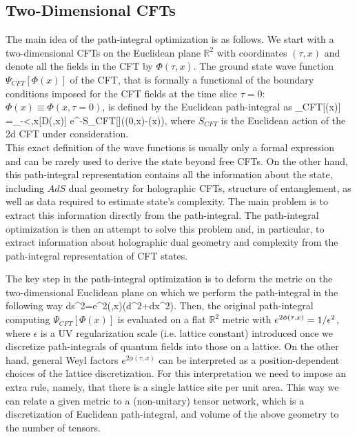 \documentclass[a4paper,12pt]{article}
\begin{document}
\subsection{Two-Dimensional CFTs}
The main idea of the path-integral optimization is as follows. We start with a two-dimensional CFTs on the Euclidean plane $\mathbb{R}^2$ with coordinates $(\tau,x)$ and denote all the fields in the CFT by $\Phi(\tau,x)$. The ground state wave function $\Psi_{CFT}[\Phi(x)]$ of the CFT, that is formally a functional of the boundary conditions imposed for the CFT fields at the time slice $\tau=0$: $\Phi(x)\equiv \Phi(x,\tau=0)$, is defined by the Euclidean path-integral as
\ba
\Psi_{CFT}[\Phi(x)] =\int \prod_{-\infty<\tau{},x}[D\ti{\Phi}(\tau,x)] e^{-S_{CFT}[\ti{\Phi}]}\delta(\ti{\Phi}(0,x)-\Phi(x)),
\ea
where $S_{CFT}$ is the Euclidean action of the 2d CFT under consideration.\\
This exact definition of the wave functions is usually only a formal expression and can be rarely used to derive the state beyond free CFTs. On the other hand, this path-integral representation contains all the information about the state, including $AdS$ dual geometry for holographic CFTs, structure of entanglement, as well as data required to estimate state's complexity. The main problem is to extract this information directly from the path-integral. The path-integral optimization is then an attempt to solve this problem and, in particular, to extract information about holographic dual geometry and complexity from the path-integral representation of CFT states.

The key step in the path-integral optimization is to deform the metric on the two-dimensional Euclidean plane on which we perform the path-integral in the following way
\ba
ds^2=e^{2\phi(\tau,x)}(d\tau^2+dx^2).  \label{curm}
\ea
Then, the original path-integral computing  $\Psi_{CFT}[\Phi(x)]$ is evaluated on a flat  $\mathbb{R}^2$ metric with $e^{2\phi(\tau,x)}=1/\epsilon^2$, where $\epsilon$ is a UV regularization scale (i.e. lattice constant) introduced once we discretize path-integrals of quantum fields into those on a lattice. On the other hand, general Weyl factors $e^{2\phi(\tau,x)}$ can be interpreted as a position-dependent choices of the lattice discretization. For this interpretation we need to impose an extra rule, namely, that there is a single lattice site per unit area. This way we can relate a given metric to a (non-unitary) tensor network, which is a discretization of Euclidean path-integral, and volume of the above geometry to the number of tensors.
\end{document}
